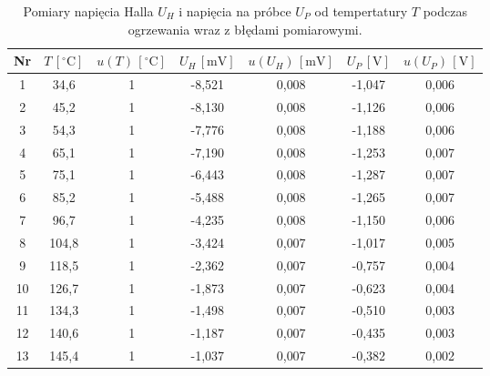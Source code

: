 \documentclass[12pt]{article}
\begin{document}
\begin{table}[H]
    \centering
    \begin{tabular}{c|cc|cc|cc}
        \toprule
        Nr & $T\,[^\circ \mathrm{C}]$ & $u(T)\,[^\circ \mathrm{C}]$ & $U_H\,[\mathrm{mV}]$ & $u(U_H)\,[\mathrm{mV}]$ & $U_P\,[\mathrm{V}]$ & $u(U_P)\,[\mathrm{V}]$ \\
        \midrule
        1  & 34{,}6  & 1 & -8{,}521 & 0{,}008 & -1{,}047 & 0{,}006 \\
        2  & 45{,}2  & 1 & -8{,}130 & 0{,}008 & -1{,}126 & 0{,}006 \\
        3  & 54{,}3  & 1 & -7{,}776 & 0{,}008 & -1{,}188 & 0{,}006 \\
        4  & 65{,}1  & 1 & -7{,}190 & 0{,}008 & -1{,}253 & 0{,}007 \\
        5  & 75{,}1  & 1 & -6{,}443 & 0{,}008 & -1{,}287 & 0{,}007 \\
        6  & 85{,}2  & 1 & -5{,}488 & 0{,}008 & -1{,}265 & 0{,}007 \\
        7  & 96{,}7  & 1 & -4{,}235 & 0{,}008 & -1{,}150 & 0{,}006 \\
        8  & 104{,}8 & 1 & -3{,}424 & 0{,}007 & -1{,}017 & 0{,}005 \\
        9  & 118{,}5 & 1 & -2{,}362 & 0{,}007 & -0{,}757 & 0{,}004 \\
        10 & 126{,}7 & 1 & -1{,}873 & 0{,}007 & -0{,}623 & 0{,}004 \\
        11 & 134{,}3 & 1 & -1{,}498 & 0{,}007 & -0{,}510 & 0{,}003 \\
        12 & 140{,}6 & 1 & -1{,}187 & 0{,}007 & -0{,}435 & 0{,}003 \\
        13 & 145{,}4 & 1 & -1{,}037 & 0{,}007 & -0{,}382 & 0{,}002 \\
        \bottomrule
    \end{tabular}
    \caption{Pomiary napięcia Halla $U_H$ i napięcia na próbce $U_P$ od tempertatury $T$ podczas ogrzewania wraz z błędami pomiarowymi.}
    \label{tab:heating_measurements}
\end{table}
\end{document}
